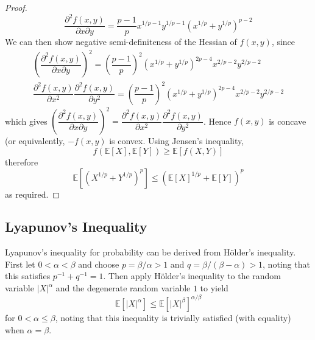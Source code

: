 \documentclass[11pt]{report} %
\begin{document}
\begin{proof}
\begin{equation}
\dfrac{\partial^{2}f\left(x,y\right)}{\partial x\partial y}=\dfrac{p-1}{p}x^{1/p-1}y^{1/p-1}\left(x^{1/p}+y^{1/p}\right)^{p-2}
\end{equation}
We can then show negative semi-definiteness of the Hessian of $f\left(x, y\right)$, since
\begin{gather}
\left(\dfrac{\partial^{2}f\left(x,y\right)}{\partial x\partial y}\right)^{2}=\left(\dfrac{p-1}{p}\right)^{2}\left(x^{1/p}+y^{1/p}\right)^{2p-4}x^{2/p-2}y^{2/p-2} \\
\dfrac{\partial^{2}f\left(x,y\right)}{\partial x^{2}}\dfrac{\partial^{2}f\left(x,y\right)}{\partial y^{2}}=\left(\dfrac{p-1}{p}\right)^{2}\left(x^{1/p}+y^{1/p}\right)^{2p-4}x^{2/p-2}y^{2/p-2}
\end{gather}
which gives $\left(\dfrac{\partial^{2}f\left(x,y\right)}{\partial x\partial y}\right)^{2} = \dfrac{\partial^{2}f\left(x,y\right)}{\partial x^{2}}\dfrac{\partial^{2}f\left(x,y\right)}{\partial y^{2}}$. Hence $f\left(x, y\right)$ is concave (or equivalently, $-f\left(x, y\right)$ is convex. Using Jensen's inequality,
\begin{equation}
f\left(\mathbb{E}\left[X\right], \mathbb{E}\left[Y\right]\right) \geq \mathbb{E}\left[f\left(X, Y\right)\right]
\end{equation}
therefore
\begin{equation}
\mathbb{E}\left[\left(X^{1/p} + Y^{1/p}\right)^{p}\right] \leq \left(\mathbb{E}\left[X\right]^{1/p} + \mathbb{E}\left[Y\right]\right)^{p}
\end{equation}
as required.
\end{proof}

\subsection{Lyapunov's Inequality}

Lyapunov's inequality for probability can be derived from H\"{o}lder's inequality. First let $0 < \alpha < \beta$ and choose $p = \beta/\alpha > 1$ and $q = \beta/\left(\beta - \alpha\right) > 1$, noting that this satisfies $p^{-1} + q^{-1} = 1$. Then apply H\"{o}lder's inequality to the random variable $\left|X\right|^{\alpha}$ and the degenerate random variable $1$ to yield
\begin{equation}
\mathbb{E}\left[\left|X\right|^{\alpha}\right]\leq\mathbb{E}\left[\left|X\right|^{\beta}\right]^{\alpha/\beta}
\end{equation}
for $0 < \alpha \leq \beta$, noting that this inequality is trivially satisfied (with equality) when $\alpha = \beta$.
\end{document}
